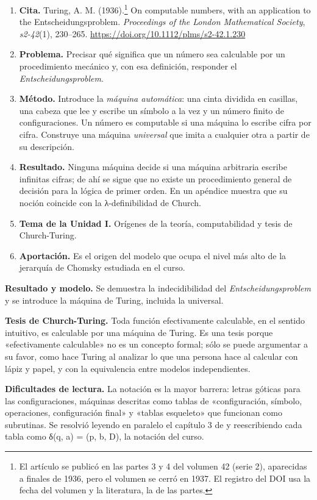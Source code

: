 \begin{enumerate}
\def\labelenumi{\arabic{enumi}.}
\tightlist
\item
  \textbf{Cita.} Turing, A. M. (1936).\footnote{El artículo se publicó en las partes 3 y 4 del volumen 42 (serie 2), aparecidas a finales de 1936, pero el volumen se cerró en 1937. El registro del DOI usa la fecha del volumen y la literatura, la de las partes.} On computable numbers, with an application to the Entscheidungsproblem. \emph{Proceedings of the London Mathematical Society}, \emph{s2-42}(1), 230--265. \url{https://doi.org/10.1112/plms/s2-42.1.230}
\item
  \textbf{Problema.} Precisar qué significa que un número sea calculable por un procedimiento mecánico y, con esa definición, responder el \emph{Entscheidungsproblem}.
\item
  \textbf{Método.} Introduce la \emph{máquina automática}: una cinta dividida en casillas, una cabeza que lee y escribe un símbolo a la vez y un número finito de configuraciones. Un número es computable si una máquina lo escribe cifra por cifra. Construye una máquina \emph{universal} que imita a cualquier otra a partir de su descripción.
\item
  \textbf{Resultado.} Ninguna máquina decide si una máquina arbitraria escribe infinitas cifras; de ahí se sigue que no existe un procedimiento general de decisión para la lógica de primer orden. En un apéndice muestra que su noción coincide con la λ-definibilidad de Church.
\item
  \textbf{Tema de la Unidad I.} Orígenes de la teoría, computabilidad y tesis de Church-Turing.
\item
  \textbf{Aportación.} Es el origen del modelo que ocupa el nivel más alto de la jerarquía de Chomsky estudiada en el curso.
\end{enumerate}

\textbf{Resultado y modelo.} Se demuestra la indecidibilidad del \emph{Entscheidungsproblem} y se introduce la máquina de Turing, incluida la universal.

\textbf{Tesis de Church-Turing.} Toda función efectivamente calculable, en el sentido intuitivo, es calculable por una máquina de Turing. Es una tesis porque «efectivamente calculable» no es un concepto formal; sólo se puede argumentar a su favor, como hace Turing al analizar lo que una persona hace al calcular con lápiz y papel, y con la equivalencia entre modelos independientes.

\textbf{Dificultades de lectura.} La notación es la mayor barrera: letras góticas para las configuraciones, máquinas descritas como tablas de «configuración, símbolo, operaciones, configuración final» y «tablas esqueleto» que funcionan como subrutinas. Se resolvió leyendo en paralelo el capítulo 3 de \textcite{sipser2013} y reescribiendo cada tabla como δ(q, a) = (p, b, D), la notación del curso.

